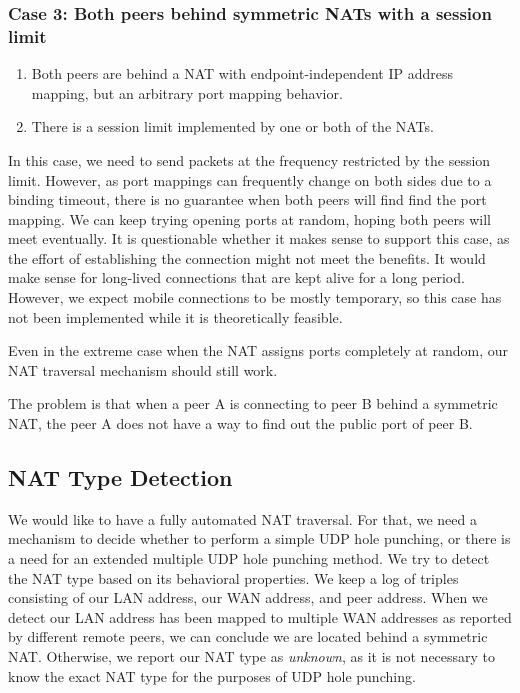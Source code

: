 \subsubsection{Case 3: Both peers behind symmetric NATs with a session limit}
\begin{enumerate}
    \item Both peers are behind a NAT with endpoint-independent IP address mapping, but an arbitrary port mapping behavior.
    \item There is a session limit implemented by one or both of the NATs.
\end{enumerate}

In this case, we need to send packets at the frequency restricted by the session limit. However, as port mappings can frequently change on both sides due to a binding timeout, there is no guarantee when both peers will find find the port mapping. We can keep trying opening ports at random, hoping both peers will meet eventually.
It is questionable whether it makes sense to support this case, as the effort of establishing the connection might not meet the benefits. It would make sense for long-lived connections that are kept alive for a long period. However, we expect mobile connections to be mostly temporary, so this case has not been implemented while it is theoretically feasible.

Even in the extreme case when the NAT assigns ports completely at random, our NAT traversal mechanism should still work.

The problem is that when a peer A is connecting to peer B behind a symmetric NAT, the peer A does not have a way to find out the public port of peer B.

\subsection{NAT Type Detection}

We would like to have a fully automated NAT traversal. For that, we need a mechanism to decide whether to perform a simple UDP hole punching, or there is a need for an extended multiple UDP hole punching method. We try to detect the NAT type based on its behavioral properties. We keep a log of triples consisting of our LAN address, our WAN address, and peer address. When we detect our LAN address has been mapped to multiple WAN addresses as reported by different remote peers, we can conclude we are located behind a symmetric NAT. Otherwise, we report our NAT type as \textit{unknown}, as it is not necessary to know the exact NAT type for the purposes of UDP hole punching.

